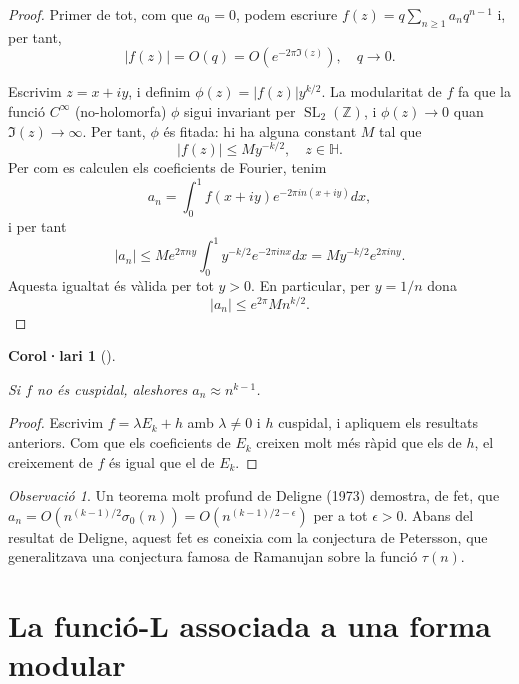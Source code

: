 \documentclass[
  letterpaper,
  DIV=11,
  numbers=noendperiod]{scrreprt}
\theoremstyle{plain}
\theoremstyle{plain}
\newtheorem{corollary}{Corol·lari}[chapter]
\theoremstyle{definition}
\theoremstyle{plain}
\theoremstyle{plain}
\theoremstyle{definition}
\theoremstyle{remark}
\newtheorem{refremark}{Observació}[chapter]
\begin{document}
\begin{proof}
Primer de tot, com que \(a_0=0\), podem escriure
\(f(z)=q\sum_{n\geq 1}a_nq^{n-1}\) i, per tant, \[
|f(z)| = O(q)=O(e^{-2\pi \Im(z)}),\quad q\longrightarrow 0.
\]

Escrivim \(z=x+iy\), i definim \(\phi(z)=|f(z)|y^{k/2}\). La modularitat
de \(f\) fa que la funció \(C^\infty\) (no-holomorfa) \(\phi\) sigui
invariant per \(\operatorname{SL}_2(\mathbb{Z})\), i
\(\phi(z)\longrightarrow 0\) quan \(\Im(z)\longrightarrow\infty\). Per
tant, \(\phi\) és fitada: hi ha alguna constant \(M\) tal que \[
|f(z)|\leq My^{-k/2},\quad z\in \mathbb{H}.
\] Per com es calculen els coeficients de Fourier, tenim \[
a_n =  \int_0^1 f(x+iy)e^{-2\pi i n(x+iy)}dx,
\] i per tant \[
|a_n| \leq Me^{2\pi n y}\int_0^1 y^{-k/2} e^{-2\pi inx}dx = My^{-k/2}e^{2\pi i n y}.
\] Aquesta igualtat és vàlida per tot \(y>0\). En particular, per
\(y=1/n\) dona \[
|a_n|\leq e^{2\pi} M n^{k/2}.
\]
\end{proof}

\begin{corollary}[]\protect\hypertarget{cor-}{}\label{cor-}

Si \(f\) no és cuspidal, aleshores \(a_n\approx n^{k-1}\).

\end{corollary}

\begin{proof}
Escrivim \(f=\lambda E_k + h\) amb \(\lambda\neq 0\) i \(h\) cuspidal, i
apliquem els resultats anteriors. Com que els coeficients de \(E_k\)
creixen molt més ràpid que els de \(h\), el creixement de \(f\) és igual
que el de \(E_k\).
\end{proof}

\begin{refremark}
Un teorema molt profund de Deligne (1973) demostra, de fet, que
\(a_n = O(n^{(k-1)/2}\sigma_0(n))=O(n^{(k-1)/2-\epsilon})\) per a tot
\(\epsilon>0\). Abans del resultat de Deligne, aquest fet es coneixia
com la conjectura de Petersson, que generalitzava una conjectura famosa
de Ramanujan sobre la funció \(\tau(n)\).

\label{rem-}

\end{refremark}

\section{La funció-L associada a una forma
modular}\label{la-funciuxf3-l-associada-a-una-forma-modular}
\end{document}

